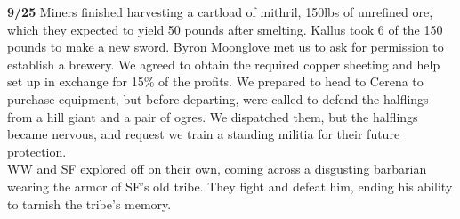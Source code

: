 \documentclass[letterpaper]{article}
\begin{document}
\noindent \textbf{9/25} Miners finished harvesting a cartload of mithril, 150lbs of unrefined ore, which they expected to yield 50 pounds after smelting. Kallus took 6 of the 150 pounds to make a new sword.  Byron Moonglove met us to ask for permission to establish a brewery.  We agreed to obtain the required copper sheeting and help set up in exchange for 15\% of the profits. We prepared to head to Cerena to purchase equipment, but before departing, were called to defend the halflings from a hill giant and a pair of ogres.  We dispatched them, but the halflings became nervous, and request we train a standing militia for their future protection. \\

\noindent WW and SF explored off on their own, coming across a disgusting barbarian wearing the armor of SF's old tribe.  They fight and defeat him, ending his ability to tarnish the tribe's memory. \\
\end{document}
